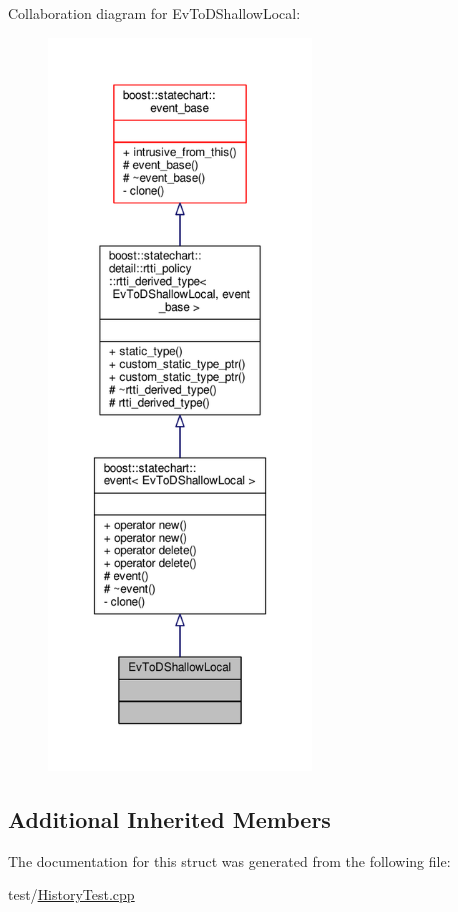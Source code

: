 Collaboration diagram for Ev\+To\+D\+Shallow\+Local\+:
\nopagebreak
\begin{figure}[H]
\begin{center}
\leavevmode
\includegraphics[height=550pt]{struct_ev_to_d_shallow_local__coll__graph}
\end{center}
\end{figure}
\subsection*{Additional Inherited Members}


The documentation for this struct was generated from the following file\+:\begin{DoxyCompactItemize}
\item 
test/\mbox{\hyperlink{_history_test_8cpp}{History\+Test.\+cpp}}\end{DoxyCompactItemize}
